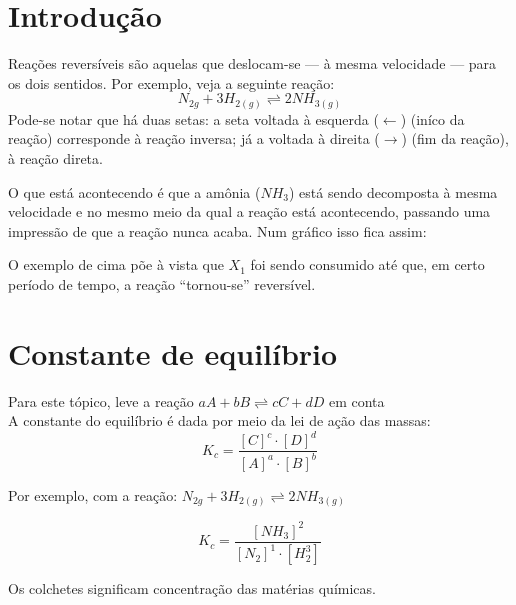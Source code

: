 \documentclass[
	12pt,				
	openright,			
	oneside,			
	a4paper,	
    article,		
	brazil				
	]{abntex2}
\begin{document}
\pagestyle{fancy}
\fancyhead{}
\fancyhead[RO]{\textbf{\MyTitle}}
\fancyfoot{}
\fancyfoot[RO]{\thepage}
\renewcommand{\footrulewidth}{0.4pt}

\frenchspacing
\imprimircapa
\tableofcontents
\newpage


\section[Introdução]{Introdução}
Reações reversíveis são aquelas que deslocam-se --- à mesma velocidade --- para os dois sentidos. Por exemplo, veja a seguinte reação:
$$N_{2g} + 3H_{2(g)}\rightleftharpoons2NH_{3(g)}$$
Pode-se notar que há duas setas: a seta voltada à esquerda ($\leftarrow$) (iníco da reação) corresponde à reação inversa; já a voltada à direita ($\rightarrow$) (fim da reação),
à reação direta.

O que está acontecendo é que a amônia ($NH_3$) está sendo decomposta à mesma velocidade e no mesmo meio da qual a reação está acontecendo, passando uma
impressão de que a reação nunca acaba. Num gráfico isso fica assim:

\begin{center}
\end{center}
O exemplo de cima põe à vista que $X_1$ foi sendo consumido até que, em certo período de tempo, a reação ``tornou-se'' reversível.

\section{Constante de equilíbrio}
 {\tiny*Para este tópico, leve a reação $aA + bB \rightleftharpoons cC + dD$ em conta} \\
A constante do equilíbrio é dada por meio da lei de ação das massas:
$$
    K_c = \frac{[C]^c\cdot[D]^d}{[A]^a\cdot[B]^b}
$$

Por exemplo, com a reação: $N_{2g} + 3H_{2(g)}\rightleftharpoons2NH_{3(g)}$

$$
    K_c = \frac{[NH_3]^2}{[N_2]^1\cdot[H_2^3]}
$$

Os colchetes significam concentração das matérias químicas.
\end{document}

